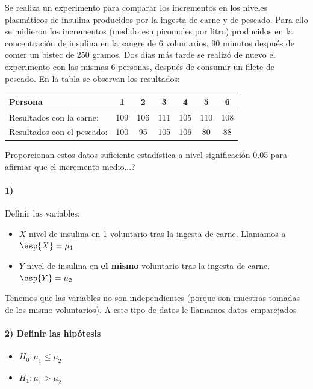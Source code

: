 \begin{problem}[6]
Se realiza un experimento para comparar los incrementos en los niveles plasmáticos de insulina producidos por la ingesta de carne y de pescado. Para ello se midieron los incrementos (medido esn picomoles por litro) producidos en la concentración de insulina en la sangre de 6 voluntarios, 90 minutos después de comer un bistec de 250 gramos. Dos días más tarde se realizó de nuevo el experimento con las mismas 6 personas, después de consumir un filete de pescado. En la tabla se observan los resultados:

\begin{tabular} {|l|c|c|c|c|c|c|}
\hline
Persona & 1 & 2 & 3 & 4 & 5 & 6\\
\hline
Resultados con la carne: & 109& 106 & 111& 105 & 110 & 108\\
\hline
Resultados con el pescado: & 100& 95& 105& 106& 80& 88\\
\hline
\end{tabular}

\ppart Proporcionan estos datos suficiente estadística a nivel significación 0.05 para afirmar que el incremento medio...?
\solution

\spart 

\paragraph{1)} Definir las variables:
\begin{itemize}
\item $X$ nivel de insulina en 1 voluntario tras la ingesta de carne. Llamamos a $\esp{X} = \mu_1$
\item $Y$ nivel de insulina en \textbf{el mismo} voluntario tras la ingesta de carne. $\esp{Y} = \mu_2$
\end{itemize}

Tenemos que las variables no son independientes (porque son muestras tomadas de los mismo voluntarios). A este tipo de datos le llamamos datos emparejados 

\paragraph{2) Definir las hipótesis}
\begin{itemize}
\item $H_0: \mu_1 \leq \mu_2$
\item $H_1 : \mu_1>\mu_2$
\end{itemize}


\end{problem}
